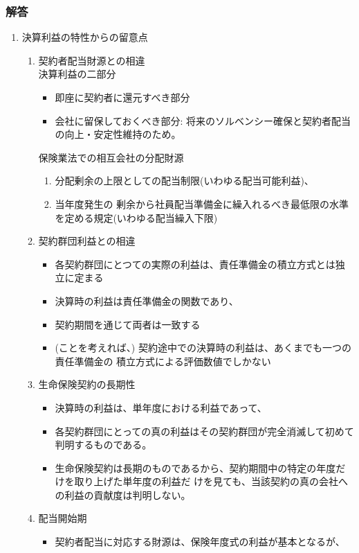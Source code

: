 \documentclass[report,gutter=10mm,fore-edge=10mm,uplatex,dvipdfmx]{jlreq}
\begin{document}
\subsubsection{解答}
\begin{enumerate}
 \item 決算利益の特性からの留意点
\begin{enumerate}
 \item 契約者配当財源との相違\\
決算利益の二部分
\begin{itemize}
 \item 即座に契約者に還元すべき部分
 \item 会社に留保しておくべき部分: 将来のソルベンシー確保と契約者配当
の向上・安定性維持のため。
\end{itemize}
保険業法での相互会社の分配財源
\begin{enumerate}
 \item 分配剰余の上限としての配当制限(いわゆる配当可能利益)、
 \item 当年度発生の
剰余から社員配当準備金に繰入れるべき最低限の水準を定める規定(いわゆる配当繰入下限)
\end{enumerate}
 \item 契約群団利益との相違
\begin{itemize}
 \item 各契約群団にとつての実際の利益は、責任準備金の積立方式とは独立に定まる
 \item 決算時の利益は責任準備金の関数であり、
 \item 契約期間を通じて両者は一致する
 \item (ことを考えれば、) 契約途中での決算時の利益は、あくまでも一つの責任準備金の
積立方式による評価数値でしかない
\end{itemize}
 \item 生命保険契約の長期性
\begin{itemize}
 \item 決算時の利益は、単年度における利益であって、
 \item 各契約群団にとっての真の利益はその契約群団が完全消滅して初めて判明するものである。
 \item 生命保険契約は長期のものであるから、契約期間中の特定の年度だけを取り上げた単年度の利益だ
けを見ても、当該契約の真の会社への利益の貢献度は判明しない。
\end{itemize}
 \item 配当開始期
\begin{itemize}
 \item 契約者配当に対応する財源は、保険年度式の利益が基本となるが、

\end{itemize}
\end{enumerate}
\end{enumerate}
\end{document}
